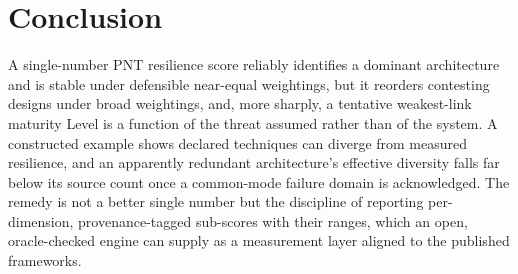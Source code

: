 \documentclass[conference]{IEEEtran}
\begin{document}
\section{Conclusion}
A single-number PNT resilience score reliably identifies a dominant architecture and is stable under defensible near-equal weightings, but it reorders contesting designs under broad weightings, and, more sharply, a tentative weakest-link maturity Level is a function of the threat assumed rather than of the system. A constructed example shows declared techniques can diverge from measured resilience, and an apparently redundant architecture's effective diversity falls far below its source count once a common-mode failure domain is acknowledged. The remedy is not a better single number but the discipline of reporting per-dimension, provenance-tagged sub-scores with their ranges, which an open, oracle-checked engine can supply as a measurement layer aligned to the published frameworks.
\end{document}
